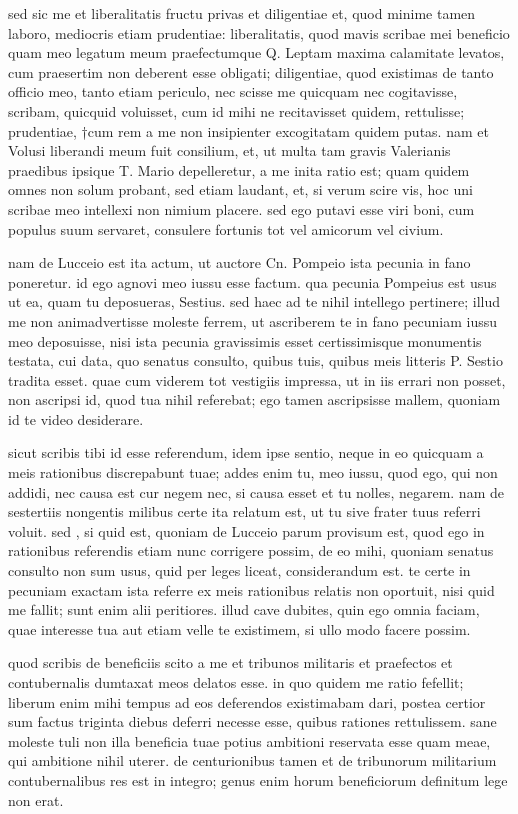  sed sic me et liberalitatis fructu privas et diligentiae et, quod minime tamen laboro, mediocris etiam prudentiae: liberalitatis, quod mavis scribae mei beneficio quam meo legatum meum praefectumque Q. Leptam maxima calamitate levatos, cum praesertim non deberent esse obligati; diligentiae, quod existimas de tanto officio meo, tanto etiam periculo, nec scisse me quicquam nec cogitavisse, scribam, quicquid voluisset, cum id mihi ne recitavisset quidem, rettulisse; prudentiae, †cum rem a me non insipienter excogitatam quidem putas. nam et Volusi liberandi meum fuit consilium, et, ut multa tam gravis Valerianis praedibus ipsique T. Mario depelleretur, a me inita ratio est; quam quidem omnes non solum probant, sed etiam laudant, et, si verum scire vis, hoc uni scribae meo intellexi non nimium placere. sed ego putavi esse viri boni, cum populus suum servaret, consulere fortunis tot vel amicorum vel civium.

 nam de Lucceio est ita actum, ut auctore Cn. Pompeio ista pecunia in fano poneretur. id ego agnovi meo iussu esse factum. qua pecunia Pompeius est usus ut ea, quam tu deposueras, Sestius. sed haec ad te nihil intellego pertinere; illud me non animadvertisse moleste ferrem, ut ascriberem te in fano pecuniam iussu meo deposuisse, nisi ista pecunia gravissimis esset certissimisque monumentis testata, cui data, quo senatus consulto, quibus tuis, quibus meis litteris P. Sestio tradita esset. quae cum viderem tot vestigiis impressa, ut in iis errari non posset, non ascripsi id, quod tua nihil referebat; ego tamen ascripsisse mallem, quoniam id te video desiderare.

 sicut scribis tibi id esse referendum, idem ipse sentio, neque in eo quicquam a meis rationibus discrepabunt tuae; addes enim tu, meo iussu, quod ego, qui non addidi, nec causa est cur negem nec, si causa esset et tu nolles, negarem. nam de sestertiis nongentis milibus certe ita relatum est, ut tu sive frater tuus referri voluit. sed , si quid est, quoniam de Lucceio parum provisum est, quod ego in rationibus referendis etiam nunc corrigere possim, de eo mihi, quoniam senatus consulto non sum usus, quid per leges liceat, considerandum est. te certe in pecuniam exactam ista referre ex meis rationibus relatis non oportuit, nisi quid me fallit; sunt enim alii peritiores. illud cave dubites, quin ego omnia faciam, quae interesse tua aut etiam velle te existimem, si ullo modo facere possim.

 quod scribis de beneficiis scito a me et tribunos militaris et praefectos et contubernalis dumtaxat meos delatos esse. in quo quidem me ratio fefellit; liberum enim mihi tempus ad eos deferendos existimabam dari, postea certior sum factus triginta diebus deferri necesse esse, quibus rationes rettulissem. sane moleste tuli non illa beneficia tuae potius ambitioni reservata esse quam meae, qui ambitione nihil uterer. de centurionibus tamen et de tribunorum militarium contubernalibus res est in integro; genus enim horum beneficiorum definitum lege non erat.

